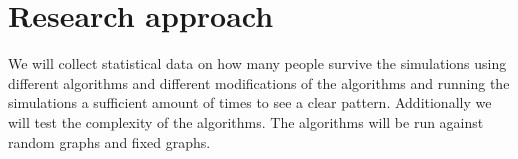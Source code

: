 \chapter{Research approach}
\label{ch:approach}




We will collect statistical data on how many people survive the simulations
using different algorithms and different modifications of the algorithms and
running the simulations a sufficient amount of times to see a clear pattern.
Additionally we will test the complexity of the algorithms.
The algorithms will be run against random graphs and fixed graphs. 

